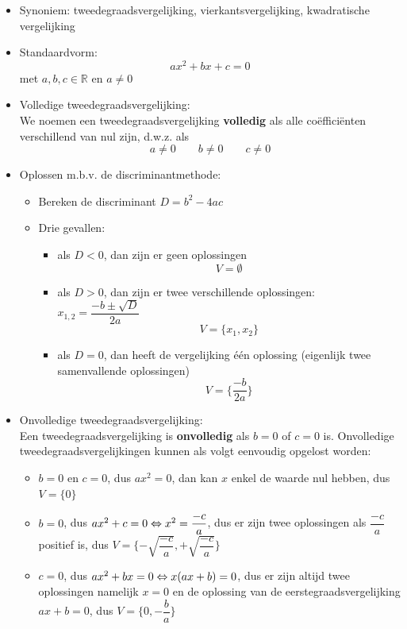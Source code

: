 \documentclass[12pt,twoside,a4paper]{article}
\begin{document}
\begin{itemize}
\item Synoniem: tweedegraadsvergelijking, vierkantsvergelijking, kwadratische vergelijking
\item Standaardvorm:
  $$ax^2 + bx + c = 0$$
  met $a, b, c \in \mathbb{R}$ en $a\neq 0$
\item Volledige tweedegraadsvergelijking:\\
  We noemen een tweedegraadsvergelijking {\bf volledig} als alle coëfficiënten verschillend van nul zijn, d.w.z. als
  $$ a\neq 0 \qquad b\neq 0 \qquad c\neq 0$$
\item Oplossen m.b.v. de discriminantmethode:
  \begin{itemize}
  \item Bereken de discriminant $D=b^2-4ac$
  \item Drie gevallen:
    \begin{itemize}
      \itemsep-1.5em
    \item als $D<0$, dan zijn er geen oplossingen
      $$V=\emptyset$$
    \item als $D>0$, dan zijn er twee verschillende oplossingen: $x_{1,2}=\dfrac{-b\pm\sqrt{D}}{2a}$
      $$V=\{x_1, x_2\}$$
    \item als $D=0$, dan heeft de vergelijking één oplossing (eigenlijk twee samenvallende oplossingen)
      $$V=\{\dfrac{-b}{2a}\}$$
    \end{itemize}
  \end{itemize}
\item Onvolledige tweedegraadsvergelijking:\\
  Een tweedegraadsvergelijking is {\bf onvolledig} als $b=0$ of $c=0$ is. Onvolledige tweedegraadsvergelijkingen kunnen als volgt eenvoudig opgelost worden:
  \begin{itemize}
    \item $b=0$ en $c=0$, dus $ax^2=0$, dan kan $x$ enkel de waarde nul hebben, dus $V=\{0\}$
    \item $b=0$, dus $ax^2+c=0 \Leftrightarrow x^2=\dfrac{-c}{a}$, dus er zijn twee oplossingen als $\dfrac{-c}{a}$ positief is, dus $V=\{-\sqrt{\dfrac{-c}{a}}, +\sqrt{\dfrac{-c}{a}}\}$
    \item $c=0$, dus $ax^2+bx=0 \Leftrightarrow x(ax+b)=0$, dus er zijn altijd twee oplossingen namelijk $x=0$ en de oplossing van de eerstegraadsvergelijking $ax+b=0$, dus $V=\{0, -\dfrac{b}{a}\}$
  \end{itemize}
\end{itemize}
\end{document}

